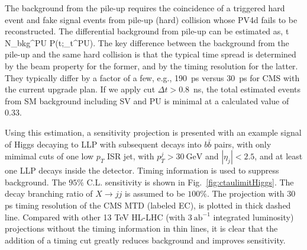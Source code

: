 The background from the pile-up requires the coincidence of a triggered hard event and fake signal events from pile-up (hard) 
collision whose PV4d fails to be reconstructed. 
The differential background from pile-up can be estimated as,
\beq
{} {\partial \Delta t} \simeq N_{\rm bkg}^{\rm PU} 
{\mathcal P}(\Delta t;\delta_t^{\rm PU}).
\label{eq:bkgPU}
\eeq
The key difference between the background from the pile-up and the same hard collision is that the typical time spread is 
determined by the beam property for the former, and by the timing resolution for the latter. They typically differ by a factor 
of a few, e.g., 190~ps versus 30~ps for CMS with the current upgrade plan. If we apply cut 
$\Delta t > 0.8$~ns, the total estimated events from SM background including SV and PU is minimal at a calculated value of 0.33.

Using this estimation, a sensitivity projection is presented with an example signal of Higgs decaying to LLP with subsequent decays into $b \bar b$ pairs, with only mimimal cuts of one low $p_T$ ISR jet, with $p_T^j > 30~\text{GeV}$ and $|\eta_j| < 2.5$, and at least one LLP decays inside the detector.
Timing information is used to suppress background. 
The $95\%$ C.L. sensitivity is shown in Fig.~\ref{fig:ctaulimitHiggs}. The decay branching ratio of 
$X \to j j$ is assumed to be $100\%$. The projection with $30$ ps timing resolution of the CMS MTD (labeled EC), is plotted in thick dashed line. 
Compared with other 13 TeV  HL-LHC (with $3 ~\text{ab}^{-1}$ integrated luminosity) projections without the timing information in thin lines, it is clear that the addition of a timing cut greatly reduces background and improves sensitivity. 

